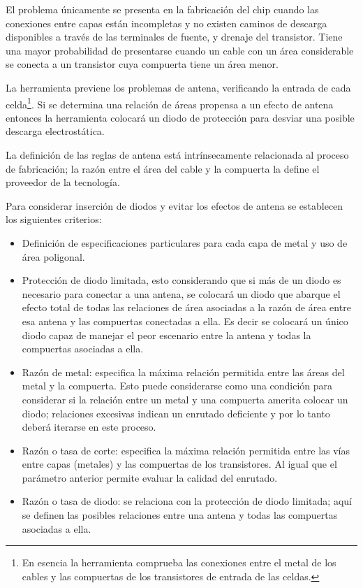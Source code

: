 El problema únicamente se presenta en la fabricación del chip cuando las conexiones entre capas están incompletas y no existen caminos de descarga disponibles a través de las terminales de fuente, y drenaje del transistor. Tiene una mayor probabilidad de presentarse cuando un cable con un área considerable se conecta a un transistor cuya compuerta tiene un área menor.

La herramienta previene los problemas de antena, verificando la entrada de cada celda\footnote{En esencia la herramienta comprueba las conexiones entre el metal de los cables y las compuertas de los transistores de entrada de las celdas.}. Si se determina una relación de áreas propensa a un efecto de antena entonces la herramienta colocará un diodo de protección para desviar una posible descarga electrostática.

La definición de las reglas de antena está intrínsecamente relacionada al proceso de fabricación; la razón entre el área del cable y la compuerta la define el proveedor de la tecnología.

Para considerar inserción de diodos y evitar los efectos de antena se establecen los siguientes criterios:

\begin{itemize}
\item Definición de especificaciones particulares para cada capa de metal y uso de área poligonal.
\item Protección de diodo limitada, esto considerando que si más de un diodo es necesario para conectar a una antena, se colocará un diodo que abarque el efecto total de todas las relaciones de área asociadas a la razón de área entre esa antena y las compuertas conectadas a ella. Es decir se colocará un único diodo capaz de manejar el peor escenario entre la antena y todas la compuertas asociadas a ella.
\item Razón de metal: especifica la máxima relación permitida entre las áreas del metal y la compuerta. Esto puede considerarse como una condición para considerar si la relación entre un metal y una compuerta amerita colocar un diodo; relaciones excesivas indican un enrutado deficiente y por lo tanto deberá iterarse en este proceso.
\item Razón o tasa de corte: especifica la máxima relación permitida entre las vías entre capas (metales) y las compuertas de los transistores. Al igual que el parámetro anterior permite evaluar la calidad del enrutado.
\item Razón o tasa de diodo: se relaciona con la protección de diodo limitada; aquí se definen las posibles relaciones entre una antena y todas las compuertas asociadas a ella.
\end{itemize}

